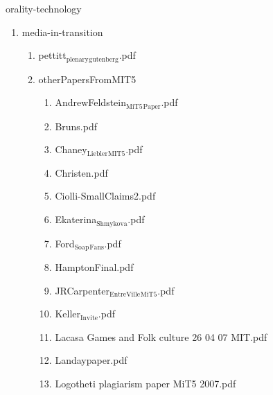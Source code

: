 \documentclass[11pt]{article}
\begin{document}
\item orality-technology
\label{sec-1-1-1-1-11-24-41}
\begin{enumerate}
\item media-in-transition
\label{sec-1-1-1-1-11-24-41-1}
\begin{enumerate}
\item pettitt$_{\text{plenary}}$$_{\text{gutenberg}}$.pdf
\label{sec-1-1-1-1-11-24-41-1-1}

\item otherPapersFromMIT5
\label{sec-1-1-1-1-11-24-41-1-2}
\begin{enumerate}
\item AndrewFeldstein$_{\text{MiT5}}$$_{\text{Paper}}$.pdf
\label{sec-1-1-1-1-11-24-41-1-2-1}

\item Bruns.pdf
\label{sec-1-1-1-1-11-24-41-1-2-2}

\item Chaney$_{\text{Liebler}}$$_{\text{MIT5}}$.pdf
\label{sec-1-1-1-1-11-24-41-1-2-3}

\item Christen.pdf
\label{sec-1-1-1-1-11-24-41-1-2-4}

\item Ciolli-SmallClaims2.pdf
\label{sec-1-1-1-1-11-24-41-1-2-5}

\item Ekaterina$_{\text{Shmykova}}$.pdf
\label{sec-1-1-1-1-11-24-41-1-2-6}

\item Ford$_{\text{Soap}}$$_{\text{Fans}}$.pdf
\label{sec-1-1-1-1-11-24-41-1-2-7}

\item HamptonFinal.pdf
\label{sec-1-1-1-1-11-24-41-1-2-8}

\item JRCarpenter$_{\text{EntreVille}}$$_{\text{MiT5}}$.pdf
\label{sec-1-1-1-1-11-24-41-1-2-9}

\item Keller$_{\text{Invite}}$.pdf
\label{sec-1-1-1-1-11-24-41-1-2-10}

\item Lacasa  Games and Folk culture 26 04 07 MIT.pdf
\label{sec-1-1-1-1-11-24-41-1-2-11}

\item Landaypaper.pdf
\label{sec-1-1-1-1-11-24-41-1-2-12}

\item Logotheti plagiarism paper MiT5 2007.pdf
\label{sec-1-1-1-1-11-24-41-1-2-13}


\end{enumerate}
\end{enumerate}
\end{enumerate}
\end{document}
